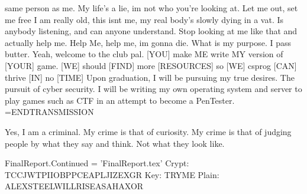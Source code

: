 same person as me. My life's a lie, im not who you're looking at. Let me out, set me free
I am really old, this isnt me, my real body's slowly dying in a vat. Is anybody listening,
and can anyone understand. Stop looking at me like that and actually help me.
Help Me, help me, im gonna die. What is my purpose. I pass butter. Yeah, welcome to the club pal.
[YOU] make {ME} write {MY} version of [YOUR] game.
[WE] should [FIND] more [RESOURCES] so [WE] csprog [CAN] thrive [IN] no [TIME]
Upon graduation, I will be pursuing my true desires. The pursuit of cyber security.
I will be writing my own operating system and server to play games such as CTF
in an attempt to become a PenTester. 
=ENDTRANSMISSION

Yes, I am a criminal. My crime is that of curiosity. 
My crime is that of judging people by what they say and think. 
Not what they look like.

FinalReport.Continued = 'FinalReport.tex'
Crypt: TCCJWTPIIOBPPCEAPLJIZEXGR 
Key: TRYME
Plain: ALEXSTEELWILLRISEASAHAXOR
